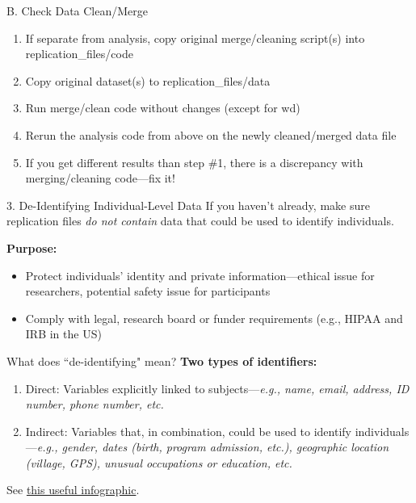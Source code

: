 \documentclass[12pt, compress, handout]{beamer}
\renewcommand{\texttt}[2][ceruleanblue]{\textcolor{#1}{\ttfamily #2}}
\let\noteitem\item %
\renewcommand{\item}{ 
	\noteitem\vspace{\fill}
	}
\begin{document}
		\begin{frame}{B. Check Data Clean/Merge}
			\begin{enumerate}
				\item If separate from analysis, copy original merge/cleaning script(s) into \texttt{replication\_files/code}
				\item Copy original dataset(s) to \texttt{replication\_files/data}
				\item Run merge/clean code without changes (except for wd)
				\item Rerun the analysis code from above on the newly cleaned/merged data file
				\item If you get different results than step \#1, there is a discrepancy with  merging/cleaning code---fix it!
			\end{enumerate}
		\end{frame}
		
	\begin{frame}{3. De-Identifying Individual-Level Data}
		If you haven't already, make sure replication files \textit{do not contain} data that could be used to identify individuals. 
		
		\bigskip
		\pause
		\textbf{Purpose:} 
		\begin{itemize}
			\item \textcolor{burntorange}{Protect individuals' identity and private information}---ethical issue for researchers, potential safety issue for participants
			\item Comply with legal, research board or funder requirements (e.g., HIPAA and IRB in the US) 
		\end{itemize}
		
	\end{frame}

	\begin{frame}{What does ``de-identifying" mean?}
		\textbf{Two types of identifiers:}
		\pause
		\begin{enumerate}
			\item \textcolor{burntorange}{Direct:} Variables explicitly linked to subjects---\textit{e.g., name, email, address, ID number, phone number, etc.}
			\item \textcolor{burntorange}{Indirect:} Variables that, in combination, could be used to identify individuals---\textit{e.g., gender, dates (birth, program admission, etc.), geographic location (village, GPS), unusual occupations or education, etc.}
		\end{enumerate}
		
		\bigskip
		\pause
		See \href{https://fpf.org/wp-content/uploads/2016/04/FPF_Visual-Guide-to-Practical-Data-DeID.pdf}{this useful infographic}.
	\end{frame}
\end{document}
